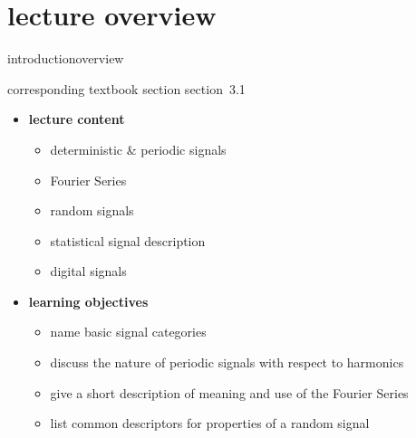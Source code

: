 


\subtitle{module 3.1: input representation~---~signals}


	

    \section[overview]{lecture overview}
        \begin{frame}{introduction}{overview}
            \begin{block}{corresponding textbook section}
                section~3.1
            \end{block}

            \begin{itemize}
                \item   \textbf{lecture content}
                    \begin{itemize}
                        \item   deterministic \& periodic signals
                        \item   Fourier Series
                        \item   random signals
                        \item   statistical signal description
                        \item   digital signals
                    \end{itemize}
                \bigskip
                \item<2->   \textbf{learning objectives}
                    \begin{itemize}
                        \item   name basic signal categories
                        \item   discuss the nature of periodic signals with respect to harmonics
                        \item   give a short description of meaning and use of the Fourier Series
                        \item   list common descriptors for properties of a random signal
                    \end{itemize}
            \end{itemize}
        \end{frame}
        
